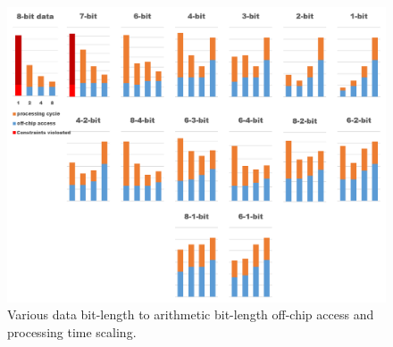 \begin{figure}[hbt!]
    \centering
    \includegraphics[width=1\linewidth]{inc/5_results/figure/bit_conf.png}
    \caption{Various data bit-length to arithmetic bit-length off-chip access and processing time scaling.}
    \label{fig:bit_conf}
\end{figure}

